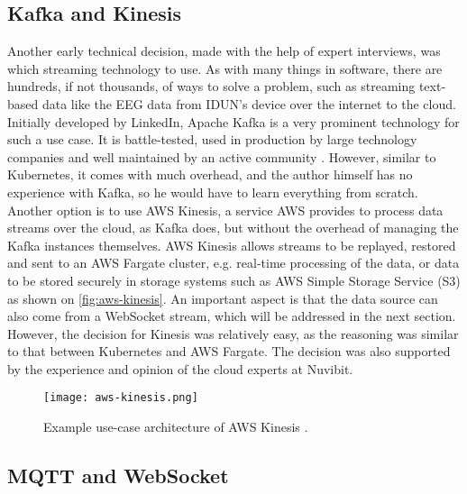 \subsection{Kafka and Kinesis}
\label{chapter4-kafka-aws-kinesis}

Another early technical decision, made with the help of expert interviews, was which streaming technology to use. As with many things in software, there are hundreds, if not thousands, of ways to solve a problem, such as streaming text-based data like the EEG data from IDUN's device over the internet to the cloud. Initially developed by LinkedIn, Apache Kafka is a very prominent technology for such a use case. It is battle-tested, used in production by large technology companies \citep{apache_apache_nodate} and well maintained by an active community \citep{noauthor_apache_2022}. However, similar to Kubernetes, it comes with much overhead, and the author himself has no experience with Kafka, so he would have to learn everything from scratch. Another option is to use AWS Kinesis, a service AWS provides to process data streams over the cloud, as Kafka does, but without the overhead of managing the Kafka instances themselves. AWS Kinesis allows streams to be replayed, restored and sent to an AWS Fargate cluster, e.g. real-time processing of the data, or data to be stored securely in storage systems such as AWS Simple Storage Service (S3) as shown on \autoref{fig:aws-kinesis}. An important aspect is that the data source can also come from a WebSocket stream, which will be addressed in the next section. However, the decision for Kinesis was relatively easy, as the reasoning was similar to that between Kubernetes and AWS Fargate. The decision was also supported by the experience and opinion of the cloud experts at Nuvibit.

\begin{figure}[!ht]
  \centering
  \texttt{[image: aws-kinesis.png]}
  \caption{Example use-case architecture of AWS Kinesis \citep{aws_amazon_nodate}.}
  \label{fig:aws-kinesis}
\end{figure}

\subsection{MQTT and WebSocket}
\label{chapter4-mqtt-and-websocket}

